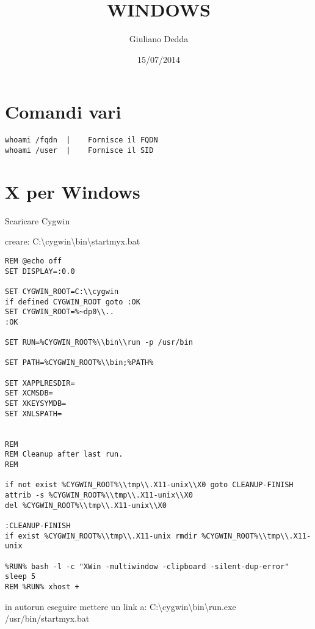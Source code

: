 \documentclass[]{article}
\title{WINDOWS}
\author{Giuliano Dedda}
\date{15/07/2014}
\begin{document}
\maketitle

\section{Comandi vari}\label{comandi-vari}

\begin{verbatim}
whoami /fqdn  |    Fornisce il FQDN
whoami /user  |    Fornisce il SID
\end{verbatim}

\section{X per Windows}\label{x-per-windows}

Scaricare Cygwin

creare:
C:\textbackslash{}cygwin\textbackslash{}bin\textbackslash{}startmyx.bat

\begin{verbatim}
REM @echo off
SET DISPLAY=:0.0

SET CYGWIN_ROOT=C:\\cygwin
if defined CYGWIN_ROOT goto :OK
SET CYGWIN_ROOT=%~dp0\\..
:OK

SET RUN=%CYGWIN_ROOT%\\bin\\run -p /usr/bin

SET PATH=%CYGWIN_ROOT%\\bin;%PATH%

SET XAPPLRESDIR=
SET XCMSDB=
SET XKEYSYMDB=
SET XNLSPATH=


REM
REM Cleanup after last run.
REM

if not exist %CYGWIN_ROOT%\\tmp\\.X11-unix\\X0 goto CLEANUP-FINISH
attrib -s %CYGWIN_ROOT%\\tmp\\.X11-unix\\X0
del %CYGWIN_ROOT%\\tmp\\.X11-unix\\X0

:CLEANUP-FINISH
if exist %CYGWIN_ROOT%\\tmp\\.X11-unix rmdir %CYGWIN_ROOT%\\tmp\\.X11-unix

%RUN% bash -l -c "XWin -multiwindow -clipboard -silent-dup-error"
sleep 5
REM %RUN% xhost +
\end{verbatim}

in autorun eseguire mettere un link a:
C:\textbackslash{}cygwin\textbackslash{}bin\textbackslash{}run.exe
/usr/bin/startmyx.bat
\end{document}
